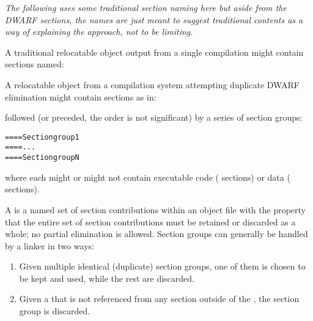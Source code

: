 \textit{The following uses some traditional section naming here
but aside from the DWARF sections, the names are just meant
to suggest traditional contents as a way of explaining the
approach, not to be limiting.}

A traditional relocatable object output 
from a single compilation might contain sections 
named:
\begin{alltt}
    \dotdata{}
    \dottext{}
    \dotdebuginfo{}
    \dotdebugabbrev{}
    \dotdebugline{}
    \dotdebugaranges{}
\end{alltt}
A relocatable object from a compilation system 
attempting duplicate DWARF elimination might
contain sections as in:

\begin{alltt}
    \dotdata{}
    \dottext{}
    \dotdebuginfo{}
    \dotdebugabbrev{}
    \dotdebugline{}
    \dotdebugaranges{}
\end{alltt}

followed (or preceded, the order is not significant) 
by a series of 
section groups:
\begin{alltt}
==== Section group 1
    \dotdebuginfo{}
    \dotdebugabbrev{}
    \dotdebugline{}
==== ...
==== Section group N
    \dotdebuginfo{}
    \dotdebugabbrev{}
    \dotdebugline{}
\end{alltt}

where each  might or might not contain executable
code (\dottext{} sections) or data (\dotdata{} sections).

A \textit{} is a named set 
of section contributions
within an object file with the property that the entire set
of section contributions must be retained or discarded as a
whole; no partial elimination is allowed. Section groups can
generally be handled by a linker in two ways:
\begin{enumerate}[1. ]

\item Given multiple identical (duplicate) section groups,
one of them is chosen to be kept and used, while the rest
are discarded.

\item Given a  
that is not referenced from any
section outside of the , 
the section group
is discarded.

\end{enumerate}


